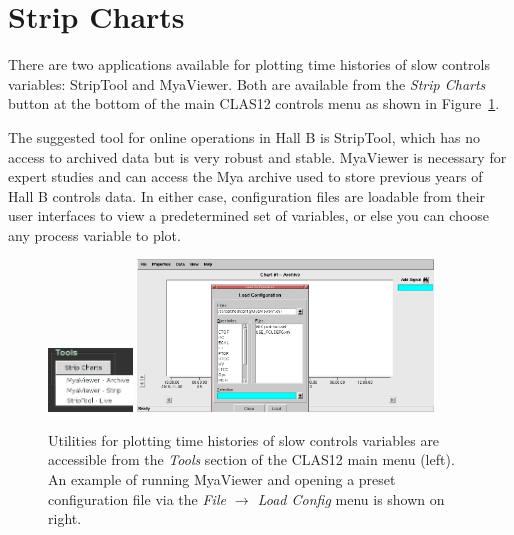 \documentclass[amsmath,amssymb,notitlepage,11pt]{revtex4}
\begin{document}
\clearpage

\section{Strip Charts}
There are two applications available for plotting time histories of slow controls variables:  StripTool and MyaViewer.  Both are available from the {\em Strip Charts} button at the bottom of the main CLAS12 controls menu as shown in Figure~\ref{fig:strips}.

The suggested tool for online operations in Hall B is StripTool, which has no access to archived data but is very robust and stable.  MyaViewer is necessary for expert studies and can access the Mya archive used to store previous years of Hall B controls data.  In either case, configuration files are loadable from their user interfaces to view a predetermined set of variables, or else you can choose any process variable to plot.

\begin{figure}[htbp]\centering
    \includegraphics[width=0.2\textwidth]{pics/strips}
    \includegraphics[width=0.7\textwidth]{pics/myaviewer}
    \caption{Utilities for plotting time histories of slow controls variables are accessible from the {\em Tools} section of the CLAS12 main menu (left).  An example of running MyaViewer and opening a preset configuration file via the {\em File $\rightarrow$ Load Config} menu is shown on right.\label{fig:strips}}
\end{figure}
\end{document}
